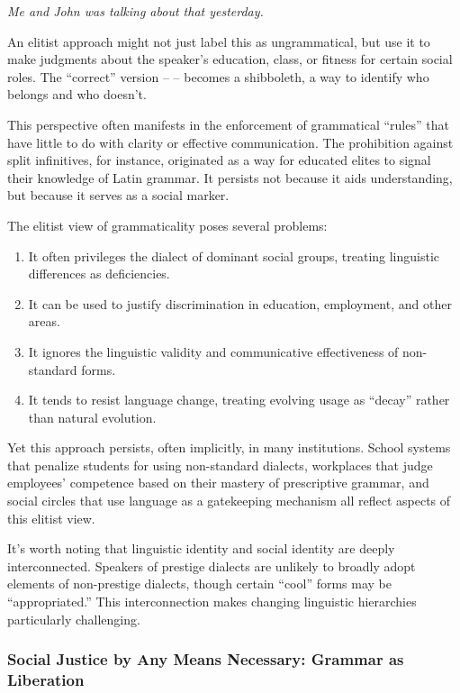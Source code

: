 \ea
\textit{Me and John was talking about that yesterday.}
\z

An elitist approach might not just label this as ungrammatical, but use it to make judgments about the speaker's education, class, or fitness for certain social roles. The ``correct'' version --  -- becomes a shibboleth, a way to identify who belongs and who doesn't.

This perspective often manifests in the enforcement of grammatical ``rules'' that have little to do with clarity or effective communication. The prohibition against split infinitives, for instance, originated as a way for educated elites to signal their knowledge of Latin grammar. It persists not because it aids understanding, but because it serves as a social marker.

The elitist view of grammaticality poses several problems:

\begin{enumerate}
    \item It often privileges the dialect of dominant social groups, treating linguistic differences as deficiencies.
    \item It can be used to justify discrimination in education, employment, and other areas.
    \item It ignores the linguistic validity and communicative effectiveness of non-standard forms.
    \item It tends to resist language change, treating evolving usage as ``decay'' rather than natural evolution.
\end{enumerate}

Yet this approach persists, often implicitly, in many institutions. School systems that penalize students for using non-standard dialects, workplaces that judge employees' competence based on their mastery of prescriptive grammar, and social circles that use language as a gatekeeping mechanism all reflect aspects of this elitist view.

It's worth noting that linguistic identity and social identity are deeply interconnected. Speakers of prestige dialects are unlikely to broadly adopt elements of non-pre\-stige dialects, though certain ``cool'' forms may be ``appropriated.'' This interconnection makes changing linguistic hierarchies particularly challenging.

\subsubsection{Social Justice by Any Means Necessary: Grammar as Liberation}

